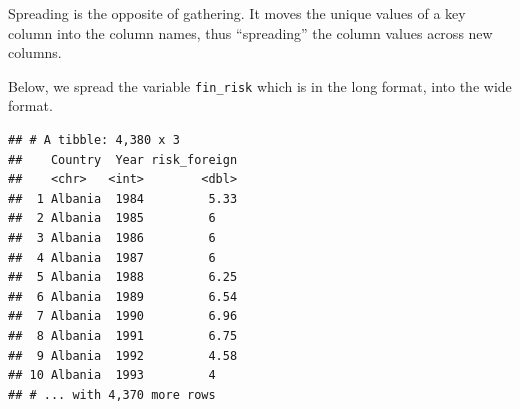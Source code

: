 \documentclass[11pt,]{article}
\newenvironment{Shaded}{\begin{snugshade}}{\end{snugshade}}
\newcommand{\KeywordTok}[1]{\textcolor[rgb]{0.13,0.29,0.53}{\textbf{#1}}}
\newcommand{\DataTypeTok}[1]{\textcolor[rgb]{0.13,0.29,0.53}{#1}}
\newcommand{\StringTok}[1]{\textcolor[rgb]{0.31,0.60,0.02}{#1}}
\newcommand{\OperatorTok}[1]{\textcolor[rgb]{0.81,0.36,0.00}{\textbf{#1}}}
\newcommand{\NormalTok}[1]{#1}
\begin{document}
Spreading is the opposite of gathering. It moves the unique values of a
key column into the column names, thus ``spreading'' the column values
across new columns.

Below, we spread the variable \texttt{fin\_risk} which is in the long
format, into the wide format.

\begin{Shaded}
\end{Shaded}

\begin{verbatim}
## # A tibble: 4,380 x 3
##    Country  Year risk_foreign
##    <chr>   <int>        <dbl>
##  1 Albania  1984         5.33
##  2 Albania  1985         6   
##  3 Albania  1986         6   
##  4 Albania  1987         6   
##  5 Albania  1988         6.25
##  6 Albania  1989         6.54
##  7 Albania  1990         6.96
##  8 Albania  1991         6.75
##  9 Albania  1992         4.58
## 10 Albania  1993         4   
## # ... with 4,370 more rows
\end{verbatim}

\begin{Shaded}
\end{Shaded}
\end{document}
